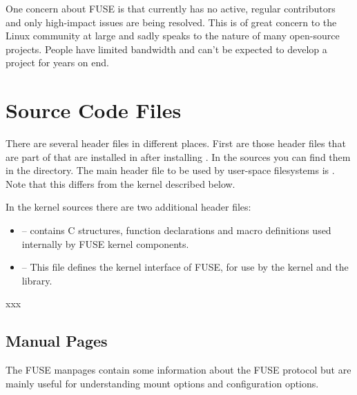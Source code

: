 \noindent
One concern about FUSE is that  currently has no active, regular contributors and only high-impact issues are being resolved. This is of great concern to the Linux community at large and sadly speaks to the nature of many open-source projects. People have limited bandwidth and can't be expected to develop a project for years on end.


\section{Source Code Files}

There are several header files in different places. First are those header files that are part of  that are installed in  after installing . In the  sources you can find them in the  directory. The main header file to be used by user-space filesystems is . Note that this differs from the kernel  described below. 

In the kernel sources there are two additional header files:

\begin{itemize}
	\item {} -- contains C structures, function declarations and macro definitions used internally by FUSE 
		kernel components.
	\item {} -- This file defines the kernel interface of FUSE,  for use by the kernel and
		the  library.
\end{itemize}

\noindent
xxx


\subsection{Manual Pages}

The FUSE manpages contain some information about the FUSE protocol but are mainly useful for understanding mount options and configuration options.

